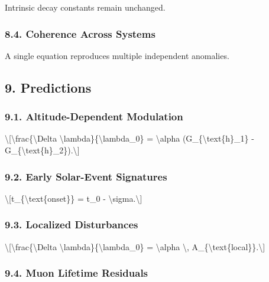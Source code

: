 \documentclass[
  10pt,
]{article}
\begin{document}
Intrinsic decay constants remain unchanged.

\hypertarget{coherence-across-systems}{%
\subsubsection{8.4. Coherence Across
Systems}\label{coherence-across-systems}}

A single equation reproduces multiple independent anomalies.

\hypertarget{predictions}{%
\subsection{9. Predictions}\label{predictions}}

\hypertarget{altitude-dependent-modulation}{%
\subsubsection{9.1. Altitude-Dependent
Modulation}\label{altitude-dependent-modulation}}

\textbackslash{[}\textbackslash frac\{\textbackslash Delta
\textbackslash lambda\}\{\textbackslash lambda\_0\} =
\textbackslash alpha (G\_\{\textbackslash text\{h\}\_1\} -
G\_\{\textbackslash text\{h\}\_2\}).\textbackslash{]}

\hypertarget{early-solar-event-signatures}{%
\subsubsection{9.2. Early Solar-Event
Signatures}\label{early-solar-event-signatures}}

\textbackslash{[}t\_\{\textbackslash text\{onset\}\} = t\_0 -
\textbackslash sigma.\textbackslash{]}

\hypertarget{localized-disturbances}{%
\subsubsection{9.3. Localized
Disturbances}\label{localized-disturbances}}

\textbackslash{[}\textbackslash frac\{\textbackslash Delta
\textbackslash lambda\}\{\textbackslash lambda\_0\} =
\textbackslash alpha \textbackslash,
A\_\{\textbackslash text\{local\}\}.\textbackslash{]}

\hypertarget{muon-lifetime-residuals}{%
\subsubsection{9.4. Muon Lifetime
Residuals}\label{muon-lifetime-residuals}}
\end{document}
